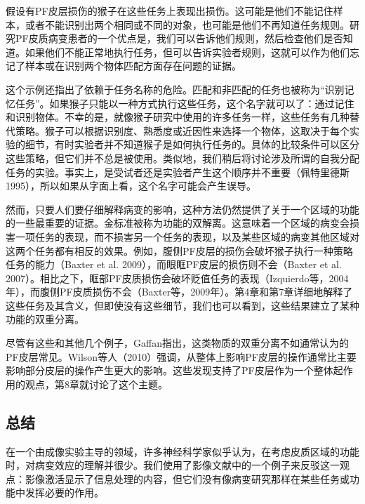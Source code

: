 \par
假设有PF皮层损伤的猴子在这些任务上表现出损伤。这可能是他们不能记住样本，或者不能识别出两个相同或不同的对象，也可能是他们不再知道任务规则。研究PF皮质病变患者的一个优点是，我们可以告诉他们规则，然后检查他们是否知道。如果他们不能正常地执行任务，但可以告诉实验者规则，这就可以作为他们忘记了样本或在识别两个物体匹配方面存在问题的证据。
\par
这个示例还指出了依赖于任务名称的危险。匹配和非匹配的任务也被称为“识别记忆任务”。如果猴子只能以一种方式执行这些任务，这个名字就可以了：通过记住和识别物体。不幸的是，就像猴子研究中使用的许多任务一样，这些任务有几种替代策略。猴子可以根据识别度、熟悉度或近因性来选择一个物体，这取决于每个实验的细节，有时实验者并不知道猴子是如何执行任务的。具体的比较条件可以区分这些策略，但它们并不总是被使用。类似地，我们稍后将讨论涉及所谓的自我分配任务的实验。事实上，是受试者还是实验者产生这个顺序并不重要（佩特里德斯1995），所以如果从字面上看，这个名字可能会产生误导。
\par
然而，只要人们要仔细解释病变的影响，这种方法仍然提供了关于一个区域的功能的一些最重要的证据。金标准被称为功能的双解离。这意味着一个区域的病变会损害一项任务的表现，而不损害另一个任务的表现，以及某些区域的病变其他区域对这两个任务都有相反的效果。例如，腹侧PF皮层的损伤会破坏猴子执行一种策略任务的能力（Baxter et al. 2009），而眼眶PF皮层的损伤则不会（Baxter et al. 2007）。相比之下，眶部PF皮质损伤会破坏贬值任务的表现（Izquierdo等，2004年），而腹侧PF皮质损伤不会（Baxter等，2009年）。第4章和第7章详细地解释了这些任务及其含义，但即使没有这些细节，我们也可以看到，这些结果建立了某种功能的双重分离。
\par
尽管有这些和其他几个例子，Gaffan指出，这类物质的双重分离不如通常认为的PF皮层常见。Wilson等人（2010）强调，从整体上影响PF皮层的操作通常比主要影响部分皮层的操作产生更大的影响。这些发现支持了PF皮层作为一个整体起作用的观点，第8章就讨论了这个主题。
\subsection{总结}
在一个由成像实验主导的领域，许多神经科学家似乎认为，在考虑皮质区域的功能时，对病变效应的理解并很少。我们使用了影像文献中的一个例子来反驳这一观点：影像激活显示了信息处理的内容，但它们没有像病变研究那样在某些任务或功能中发挥必要的作用。
